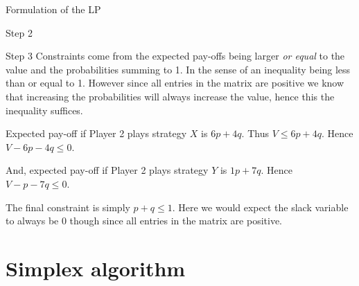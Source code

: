 \documentclass[8pt]{beamer}
\begin{document}
\begin{frame}[allowframebreaks]{Formulation of the LP}
\begin{exampleblock}{Step 2}
\end{exampleblock}

\begin{exampleblock}{Step 3}
	Constraints come from the expected pay-offs being larger \emph{or equal} to the value and the probabilities summing to 1. In the sense of an inequality being less than or equal to 1. However since all entries in the matrix are positive we know that increasing the probabilities will always increase the value, hence this the inequality suffices.  
	
Expected pay-off if Player 2 plays strategy $X$ is  $6p+4q$. Thus  $V\leq 6p+4q$. Hence  $V-6p-4q\leq 0$.

And, expected pay-off if Player 2 plays strategy $Y$ is  $1p+7q$. Hence  $V-p-7q\leq 0$. 

The final constraint is simply $p+q \leq 1$. Here we would expect the slack variable to always be 0 though since all entries in the matrix are positive. 
\end{exampleblock}


\end{frame}

\section{Simplex algorithm}%
\end{document}
